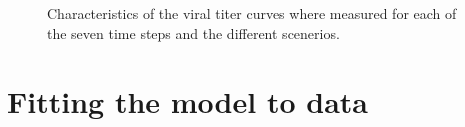 \begin{figure}
\begin{minipage}{\linewidth}
{    }
\end{minipage}
\caption{Characteristics of the viral titer curves where measured for each of the seven time steps and the different scenerios.\label{fig_AspectGraphs}}
\end{figure}

\section{Fitting the model to data}

